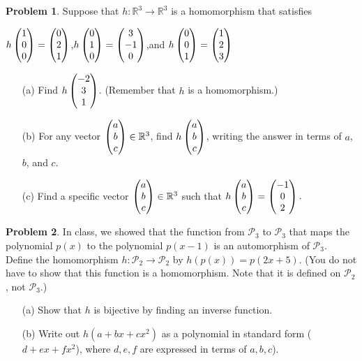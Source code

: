 \documentclass[11pt]{article}
\newcommand{\R}{{\mathbb R}}
\theoremstyle{definition}
\newtheorem{problem}{Problem}
\newenvironment{answer}{\par\bigskip\bgroup\color{darkblue}}{\egroup}
\begin{document}
\begin{problem}
Suppose that $h\colon \R^3\to\R^3$ is a homomorphism that satisfies

\bigskip
\centerline{$h\begin{pmatrix}1\\0\\0\end{pmatrix}=\begin{pmatrix}0\\2\\1\end{pmatrix}$,\qquad $h\begin{pmatrix}0\\1\\0\end{pmatrix}=\begin{pmatrix}3\\-1\\0\end{pmatrix}$,\quad and\quad
             $h\begin{pmatrix}0\\0\\1\end{pmatrix}=\begin{pmatrix}1\\2\\3\end{pmatrix}$}
\begin{itemize}
\item[(a)] Find $h\begin{pmatrix}-2\\3\\1\end{pmatrix}$. (Remember that $h$ is a homomorphism.)
\item[(b)] For any vector $\vc{a\\b\\c}\in\R^3$, find $h\begin{pmatrix}a\\b\\c\end{pmatrix}$, writing the answer in
terms of $a$, $b$, and $c$. 
\item[(c)] Find a specific vector $\vc{a\\b\\c}\in\R^3$ such that $h\begin{pmatrix}a\\b\\c\end{pmatrix} = \begin{pmatrix}-1\\0\\2\end{pmatrix}.$
\end{itemize}
\end{problem}

\begin{answer}
\end{answer}




\begin{problem}
In class, we showed that the function from $\mathscr P_3$ to $\mathscr P_3$ that maps
the polynomial $p(x)$ to the polynomial $p(x-1)$ is an automorphism of $\mathscr P_3$.
Define the homomorphism $h\colon\mathscr P_2\to \mathscr P_2$ by $h(p(x)) = p(2x+5)$.
(You do not have to show that this function is a homomorphism.  Note that it is defined
on $\mathscr P_2$, not $\mathscr P_3$.)
\begin{itemize}
\item[(a)] Show that $h$ is bijective by finding an inverse function.
\item[(b)] Write out $h(a+bx+cx^2)$ as a polynomial in standard form ($d+ex+fx^2$),
where $d,e,f$ are expressed in terms of $a,b,c$).
\end{itemize}
\end{problem}
\end{document}
